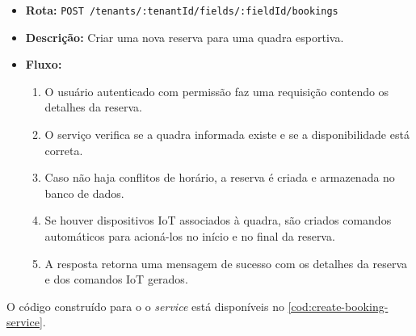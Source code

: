 \begin{itemize}
    \item \textbf{Rota:} \texttt{POST /tenants/:tenantId/fields/:fieldId/bookings}
    \item \textbf{Descrição:} Criar uma nova reserva para uma quadra esportiva.
    \item \textbf{Fluxo:}
    \begin{enumerate}
        \item O usuário autenticado com permissão faz uma requisição contendo os detalhes da reserva.
        \item O serviço verifica se a quadra informada existe e se a disponibilidade está correta.
        \item Caso não haja conflitos de horário, a reserva é criada e armazenada no banco de dados.
        \item Se houver dispositivos IoT associados à quadra, são criados comandos automáticos para acioná-los no início e no final da reserva.
        \item A resposta retorna uma mensagem de sucesso com os detalhes da reserva e dos comandos IoT gerados.
    \end{enumerate}
\end{itemize}

O código construído para o o \textit{service} está disponíveis no \autoref{cod:create-booking-service}.

